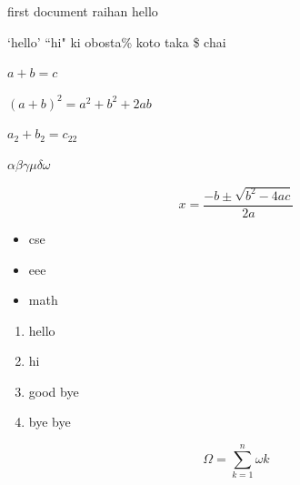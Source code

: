 \documentclass{article}
\begin{document}
first document
raihan  hello 

`hello'
``hi"
ki obosta\% 
koto taka \$ chai

$a+b = c$

$(a+b)^2 = a^2 + b^2 + 2ab $

$a_2 + b_2 = c_{22} $

$\alpha \beta \gamma  \mu \delta \omega $

\begin{equation}
    x=\frac{-b\pm\sqrt{b^2 - 4ac}}{2a}
\end{equation}

\begin{itemize}
    \item cse 
    \item eee 
    \item math
\end{itemize}

\begin{enumerate}
    \item hello 
    \item hi 
    \item good bye 
    \item bye bye
\end{enumerate}

\begin{equation*}
    \Omega = \sum_{k=1}^{n} \omega k
\end{equation*}
\end{document}
